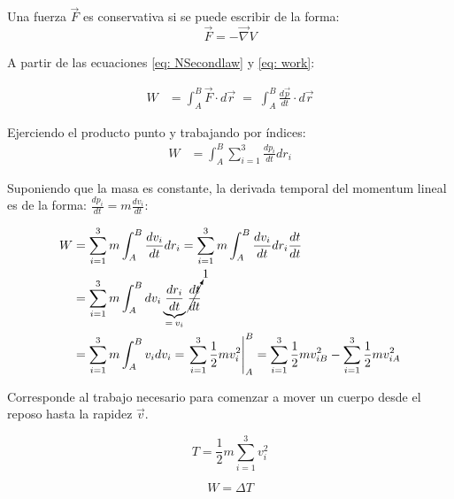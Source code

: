 \documentclass[/home/hernan/Documentos/Apuntes_mecanica_teorica/main.tex]{subfiles}
\begin{document}
	\begin{definition} Una fuerza $\vec{F}$ es conservativa si se puede escribir de la forma:
		\begin{equation}
			\vec{F} = - \vec{\nabla}V
			\label{eq: conservativeforce}
		\end{equation}
	\end{definition}

	A partir de las ecuaciones \ref{eq: NSecondlaw} y \ref{eq: work}:

	\begin{align*}
		W & = \int_{A}^{B} \vec{F} \cdot d\vec{r} \; = \; \int_{A}^{B}  \frac{d \vec{p}}{dt} \cdot d\vec{r}
	\end{align*}

	Ejerciendo el producto punto y trabajando por índices:
	\begin{align*}
		W & = \int_{A}^{B} \sum_{i=1}^{3} \frac{d p_{i}}{dt}dr_{i}
	\end{align*}

	Suponiendo que la masa es constante, la derivada temporal del momentum lineal es de la forma: $\frac{d p_{i}}{dt} = m \frac{d v_{i}}{dt}$:

	\begin{align*}
		W & =  \sum_{i=1}^{3} m \int_{A}^{B} \frac{d v_{i}}{dt}dr_{i} =  \sum_{i=1}^{3} m \int_{A}^{B} \frac{d v_{i}}{dt}dr_{i} \frac{dt}{dt}\\ 
		& = \sum_{i=1}^{3} m \int_{A}^{B} d v_{i} \underbrace{\frac{d r_{i}}{dt}}_{= \: v_{i}} \cancelto{1}{\frac{dt}{dt}}\\
		& = \sum_{i=1}^{3} m \int_{A}^{B}  v_{i} d v_{i} = \left . \sum_{i=1}^{3} \frac{1}{2} m v_{i}^{2} \right|_{A} ^{B} = \sum_{i=1}^{3} \frac{1}{2} m v_{iB}^{2} - \sum_{i=1}^{3} \frac{1}{2} m v_{iA}^{2}
	\end{align*}

	\begin{definition} Corresponde al trabajo necesario para comenzar a mover un cuerpo desde el reposo hasta la rapidez $\vec{v}$.

		\begin{equation} 
			T =  \frac{1}{2} m \sum_{i=1}^{3} v_{i}^{2}
			\label{eq: Ttras}
		\end{equation}
	\end{definition}

	\begin{theorem}

		\begin{equation}
			W = \Delta T
			\label{eq: workT}
		\end{equation}
		
	\end{theorem}
\end{document}

